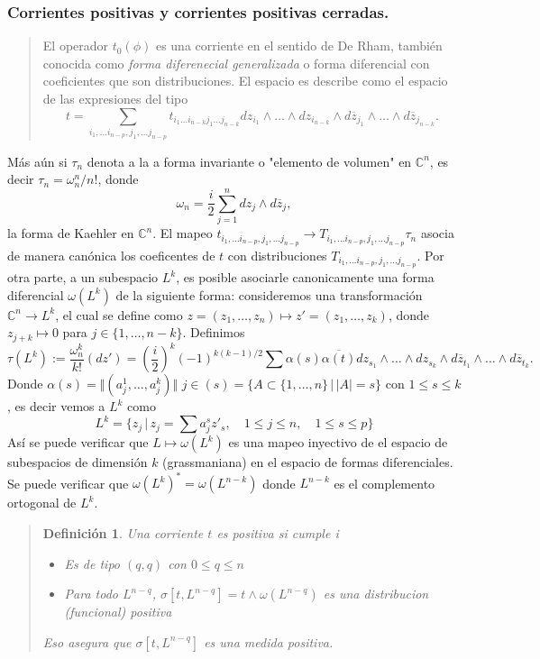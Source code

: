 \documentclass[letterpaper]{article}
\newtheorem{def.}{Definici\'on}[section]
\newcommand{\con}{\ensuremath{\mathbb{C}^n}}
\begin{document}
\subsubsection{Corrientes positivas y corrientes positivas cerradas.}
\label{sec:orgb974b8f}
\begin{quote}
El operador \(t_0(\phi)\) es una corriente en el sentido de De Rham, también conocida como \emph{forma diferenecial generalizada} o forma diferencial con coeficientes que son distribuciones. El espacio es describe como el espacio de las expresiones del tipo
\[
    t=\sum_{i_1,\dots i_{n-p},j_1,\dots j_{n-p}}t_{i_1\dots i_{n-k}j_1\dots j_{n-k}} dz_{i_1}\wedge\dots\wedge dz_{i_{n-k}}\wedge d\overline{z}_{j_1}\wedge\dots\wedge d\overline{z}_{j_{n-k}}.
\]
\end{quote}
Más aún si \(\tau_n\) denota a la a forma invariante o "elemento de volumen" en \(\con\), es decir \(\tau_n=\omega_n^n/n!\), donde
\[
    \omega_n=\frac{i}{2}\sum_{j=1}^n dz_j\wedge d\overline{z}_j,
\]
la forma de Kaehler en \(\con\). El mapeo \(t_{i_1,\dots i_{n-p},j_1,\dots j_{n-p}}\rightarrow T_{i_1,\dots i_{n-p},j_1,\dots j_{n-p}}\tau_n\) asocia de manera canónica los coeficentes de \(t\) con distribuciones \(T_{i_1,\dots i_{n-p},j_1,\dots j_{n-p}}\). Por otra parte, a un subespacio \(L^k\), es posible asociarle canonicamente una forma diferencial \(\omega(L^k)\) de la siguiente forma: consideremos una transformación \(\con\rightarrow L^k\), el cual se define como \(z=(z_1,\dots,z_n)\mapsto z'=(z_1,\dots,z_k)\), donde \(z_{j+k}\mapsto 0\) para \(j\in\{1,\dots,n-k\}\). Definimos
\[
    \tau(L^k):=\frac{\omega_n^k}{k!}(dz')=(\frac{i}{2})^k(-1)^{k(k-1)/2}\sum \alpha(s)\overline{\alpha(t)}dz_{s_1}\wedge\dots\wedge dz_{s_k}\wedge d\overline{z}_{t_1}\wedge \dots\wedge d\overline{z}_{t_k}.
\]
Donde \(\alpha(s)=\Vert(a^{1}_{j},\dots,a^{k}_{j})\Vert\) \(j\in(s)=\{A\subset\{1,\dots,n\}\,\vert\, |A|=s\}\) con \(1\leq s\leq k\), es decir vemos a \(L^k\) como
\[
    L^k=\{z_j\,\vert\,z_j=\sum a^{s}_{j}z'_s,\quad 1\leq j\leq n,\quad 1\leq s\leq p \}
\]
Así se puede verificar que \(L\mapsto\omega(L^k)\) es una mapeo inyectivo de el espacio de subespacios de dimensión \(k\) (grassmaniana) en el espacio de formas diferenciales. Se puede verificar que \(\omega(L^k)^{*}=\omega(L^{n-k})\) donde \(L^{n-k}\) es el complemento ortogonal de \(L^k\).
\begin{quote}
\begin{def.}
    Una corriente \(t\) es positiva si cumple
i    \begin{itemize}
        \item[a)] Es de tipo \((q,q)\) con \(0\leq q\leq n\)
        \item[b)] Para todo \(L^{n-q}\), \(\sigma[t,L^{n-q}]=t\wedge\omega(L^{n-q})\) es una distribucion (funcional) positiva
    \end{itemize}
    Eso asegura que \(\sigma[t,L^{n-q}]\) es una medida positiva.
\end{def.}
\end{quote}
\end{document}
